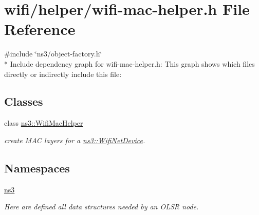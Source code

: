 \hypertarget{wifi-mac-helper_8h}{}\section{wifi/helper/wifi-\/mac-\/helper.h File Reference}
\label{wifi-mac-helper_8h}
{\ttfamily \#include \char`\"{}ns3/object-\/factory.\+h\char`\"{}}\\*
Include dependency graph for wifi-\/mac-\/helper.h\+:
This graph shows which files directly or indirectly include this file\+:
\subsection*{Classes}
\begin{DoxyCompactItemize}
\item 
class \hyperlink{classns3_1_1WifiMacHelper}{ns3\+::\+Wifi\+Mac\+Helper}
\begin{DoxyCompactList}\small\item\em create M\+AC layers for a \hyperlink{classns3_1_1WifiNetDevice}{ns3\+::\+Wifi\+Net\+Device}. \end{DoxyCompactList}\end{DoxyCompactItemize}
\subsection*{Namespaces}
\begin{DoxyCompactItemize}
\item 
 \hyperlink{namespacens3}{ns3}
\begin{DoxyCompactList}\small\item\em Here are defined all data structures needed by an O\+L\+SR node. \end{DoxyCompactList}\end{DoxyCompactItemize}
